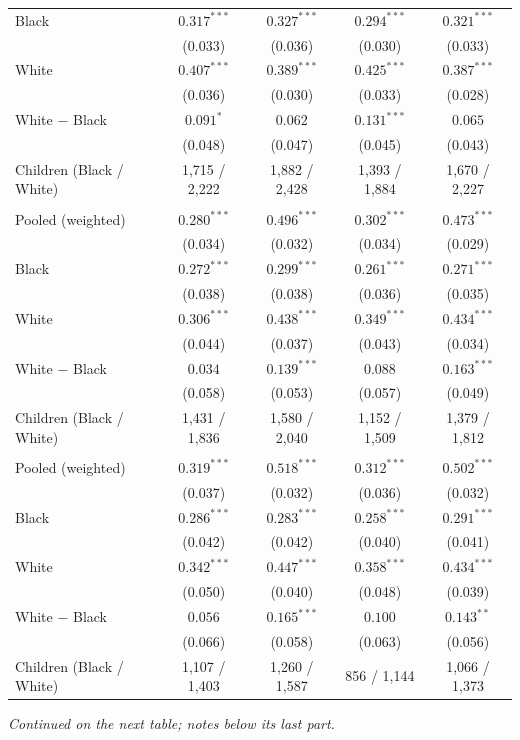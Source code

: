 \begin{table}[!htbp]
{{\begin{tabular}{lcccc}
Black & $0.317^{***}$ & $0.327^{***}$ & $0.294^{***}$ & $0.321^{***}$ \\
 & (0.033) & (0.036) & (0.030) & (0.033) \\
White & $0.407^{***}$ & $0.389^{***}$ & $0.425^{***}$ & $0.387^{***}$ \\
 & (0.036) & (0.030) & (0.033) & (0.028) \\
White $-$ Black & $0.091^{*}$ & $0.062$ & $0.131^{***}$ & $0.065$ \\
 & (0.048) & (0.047) & (0.045) & (0.043) \\
Children (Black / White) & 1,715 / 2,222 & 1,882 / 2,428 & 1,393 / 1,884 & 1,670 / 2,227 \\
\addlinespace
\multicolumn{5}{l}{\textit{Age 35--39}} \\
Pooled (weighted) & $0.280^{***}$ & $0.496^{***}$ & $0.302^{***}$ & $0.473^{***}$ \\
 & (0.034) & (0.032) & (0.034) & (0.029) \\
Black & $0.272^{***}$ & $0.299^{***}$ & $0.261^{***}$ & $0.271^{***}$ \\
 & (0.038) & (0.038) & (0.036) & (0.035) \\
White & $0.306^{***}$ & $0.438^{***}$ & $0.349^{***}$ & $0.434^{***}$ \\
 & (0.044) & (0.037) & (0.043) & (0.034) \\
White $-$ Black & $0.034$ & $0.139^{***}$ & $0.088$ & $0.163^{***}$ \\
 & (0.058) & (0.053) & (0.057) & (0.049) \\
Children (Black / White) & 1,431 / 1,836 & 1,580 / 2,040 & 1,152 / 1,509 & 1,379 / 1,812 \\
\addlinespace
\multicolumn{5}{l}{\textit{Age 40--44}} \\
Pooled (weighted) & $0.319^{***}$ & $0.518^{***}$ & $0.312^{***}$ & $0.502^{***}$ \\
 & (0.037) & (0.032) & (0.036) & (0.032) \\
Black & $0.286^{***}$ & $0.283^{***}$ & $0.258^{***}$ & $0.291^{***}$ \\
 & (0.042) & (0.042) & (0.040) & (0.041) \\
White & $0.342^{***}$ & $0.447^{***}$ & $0.358^{***}$ & $0.434^{***}$ \\
 & (0.050) & (0.040) & (0.048) & (0.039) \\
White $-$ Black & $0.056$ & $0.165^{***}$ & $0.100$ & $0.143^{**}$ \\
 & (0.066) & (0.058) & (0.063) & (0.056) \\
Children (Black / White) & 1,107 / 1,403 & 1,260 / 1,587 & 856 / 1,144 & 1,066 / 1,373 \\
\bottomrule
\end{tabular}}}
\par\smallskip
\begin{minipage}{\textwidth}\footnotesize \textit{Continued on the next table; notes below its last part.}\end{minipage}
\end{table}
